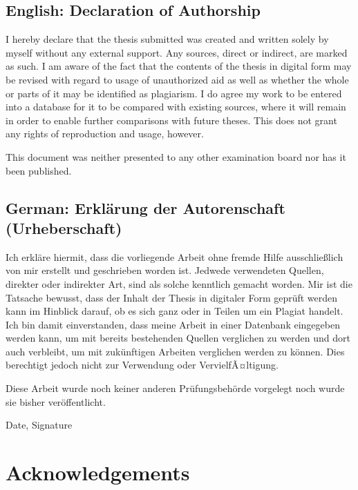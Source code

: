 \documentclass[a4paper,11pt,oneside]{article}
\begin{document}
\subsection*{English: Declaration of Authorship}
 
I hereby declare that the thesis submitted was created and written
solely by myself without any external support. Any sources, direct
or indirect, are marked as such. I am aware of the fact that the
contents of the thesis in digital form may be revised with regard to
usage of unauthorized aid as well as whether the whole or parts of
it may be identified as plagiarism. I do agree my work to be entered
into a database for it to be compared with existing sources, where
it will remain in order to enable further comparisons with future
theses. This does not grant any rights of reproduction and usage,
however.

This document was neither presented to any other examination board
nor has it been published.

\subsection*{German: Erklärung der Autorenschaft (Urheberschaft)}
 
Ich erkläre hiermit, dass die vorliegende Arbeit ohne fremde Hilfe
ausschließlich von mir erstellt und geschrieben worden ist. Jedwede
verwendeten Quellen, direkter oder indirekter Art, sind als solche
kenntlich gemacht worden. Mir ist die Tatsache bewusst, dass der
Inhalt der Thesis in digitaler Form geprüft werden kann im Hinblick
darauf, ob es sich ganz oder in Teilen um ein Plagiat handelt. Ich
bin damit einverstanden, dass meine Arbeit in einer Datenbank
eingegeben werden kann, um mit bereits bestehenden Quellen
verglichen zu werden und dort auch verbleibt, um mit zukünftigen
Arbeiten verglichen werden zu können. Dies berechtigt jedoch nicht
zur Verwendung oder VervielfÃ¤ltigung.

Diese Arbeit wurde noch keiner anderen Prüfungsbehörde vorgelegt
noch wurde sie bisher veröffentlicht.

\vspace{20mm}

Date, Signature

\newpage

\section*{Acknowledgements}
\end{document}

